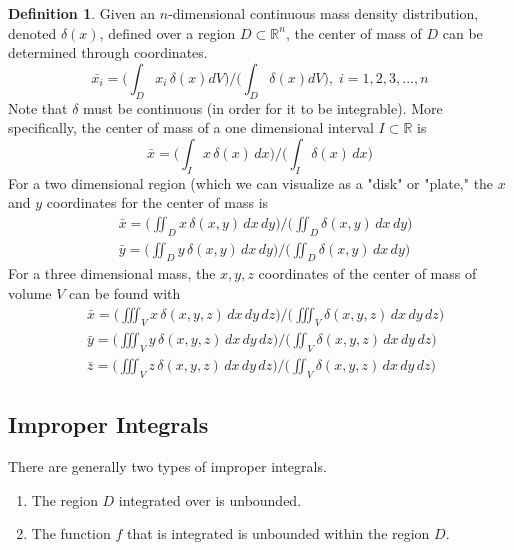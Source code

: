 \documentclass{article}
\theoremstyle{remark}
\theoremstyle{definition}
\newtheorem{definition}{Definition}[section]
\begin{document}
\begin{definition}
Given an $n$-dimensional continuous mass density distribution, denoted $\delta(x)$, defined over a region $D \subset \mathbb{R}^n$, the center of mass of $D$ can be determined through coordinates.
\[\bar{x_i} = \bigg( \int_D x_i \, \delta(x) d V\bigg) \bigg/ \bigg(\int_D \delta(x) d V \bigg), \; i = 1, 2, 3, ..., n\]
Note that $\delta$ must be continuous (in order for it to be integrable). More specifically, the center of mass of a one dimensional interval $I \subset \mathbb{R}$ is
\[\bar{x} = \bigg(\int_I x\, \delta(x) \, dx\bigg) \bigg/ \bigg(\int_I \delta(x) \, dx\bigg)\]
For a two dimensional region (which we can visualize as a "disk" or "plate," the $x$ and $y$ coordinates for the center of mass is
\begin{align*}
    & \bar{x} = \bigg(\iint_D x\, \delta(x, y) \, dx\,dy\bigg) \bigg/ \bigg(\iint_D \delta(x, y) \, dx\,dy \bigg) \\
    & \bar{y} = \bigg(\iint_D y\, \delta(x, y) \, dx\,dy\bigg) \bigg/ \bigg(\iint_D \delta(x, y) \, dx\,dy \bigg)
\end{align*}
For a three dimensional mass, the $x, y, z$ coordinates of the center of mass of volume $V$ can be found with
\begin{align*}
    & \bar{x} = \bigg(\iiint_V x\, \delta(x, y, z) \, dx\,dy\,dz\bigg) \bigg/ \bigg(\iiint_V \delta(x, y, z) \, dx\,dy \,dz\bigg) \\
    & \bar{y} = \bigg(\iiint_V y\, \delta(x, y, z) \, dx\,dy\,dz\bigg) \bigg/ \bigg(\iint_V \delta(x, y, z) \, dx\,dy\,dz \bigg) \\
    & \bar{z} = \bigg(\iiint_V z\, \delta(x, y, z) \, dx\,dy\,dz\bigg) \bigg/ \bigg(\iint_V \delta(x, y, z) \, dx\,dy\,dz \bigg)
\end{align*}
\end{definition}

\subsection{Improper Integrals}
There are generally two types of improper integrals. 
\begin{enumerate}
    \item The region $D$ integrated over is unbounded. 
    \item The function $f$ that is integrated is unbounded within the region $D$.
\end{enumerate}
\end{document}
